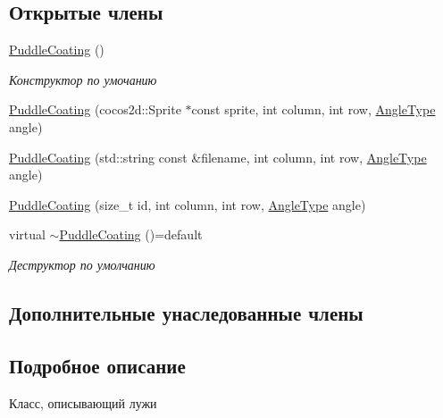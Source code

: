 \subsection*{Открытые члены}
\begin{DoxyCompactItemize}
\item 
\mbox{\label{classrtm_1_1_puddle_coating_adc8ec09ad8833bf8ae77a77ce37a7945}} 
\hyperlink{classrtm_1_1_puddle_coating_adc8ec09ad8833bf8ae77a77ce37a7945}{Puddle\+Coating} ()
\begin{DoxyCompactList}\small\item\em Конструктор по умочанию \end{DoxyCompactList}\item 
\hyperlink{classrtm_1_1_puddle_coating_a7624921639d25bb1061d0344790375b4}{Puddle\+Coating} (cocos2d\+::\+Sprite $\ast$const sprite, int column, int row, \hyperlink{namespacertm_a69dc82b16a0148c10962caa83d930f89}{Angle\+Type} angle)
\item 
\hyperlink{classrtm_1_1_puddle_coating_a82e0dcae5a891240e2d89cd84f672cb8}{Puddle\+Coating} (std\+::string const \&filename, int column, int row, \hyperlink{namespacertm_a69dc82b16a0148c10962caa83d930f89}{Angle\+Type} angle)
\item 
\hyperlink{classrtm_1_1_puddle_coating_a3e0e44711ab312c092fc3cf130984b15}{Puddle\+Coating} (size\+\_\+t id, int column, int row, \hyperlink{namespacertm_a69dc82b16a0148c10962caa83d930f89}{Angle\+Type} angle)
\item 
\mbox{\label{classrtm_1_1_puddle_coating_a14d812f0ffd6f7eea21abdb1b3fcb9ef}} 
virtual \hyperlink{classrtm_1_1_puddle_coating_a14d812f0ffd6f7eea21abdb1b3fcb9ef}{$\sim$\+Puddle\+Coating} ()=default
\begin{DoxyCompactList}\small\item\em Деструктор по умолчанию \end{DoxyCompactList}\end{DoxyCompactItemize}
\subsection*{Дополнительные унаследованные члены}


\subsection{Подробное описание}
Класс, описывающий лужи 

